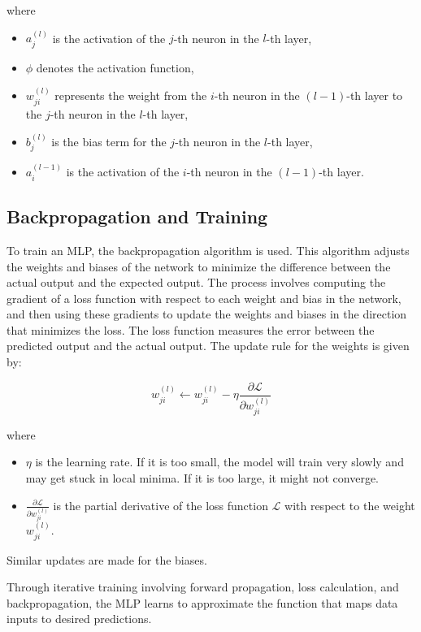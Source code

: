 where
\begin{itemize}
	\item $a^{(l)}_j$ is the activation of the $j$-th neuron in the $l$-th layer,
	\item $\phi$ denotes the activation function,
	\item $w^{(l)}_{ji}$ represents the weight from the $i$-th neuron in the $(l-1)$-th layer to the $j$-th neuron in the $l$-th layer,
	\item $b^{(l)}_j$ is the bias term for the $j$-th neuron in the $l$-th layer,
	\item $a^{(l-1)}_i$ is the activation of the $i$-th neuron in the $(l-1)$-th layer.
\end{itemize}

\subsection{Backpropagation and Training}

To train an MLP, the backpropagation algorithm is used.
This algorithm adjusts the weights and biases of the network to minimize the difference between the actual output and the expected output.
The process involves computing the gradient of a loss function with respect to each weight and bias in the network, and then using these gradients to update the weights and biases in the direction that minimizes the loss.
The loss function measures the error between the predicted output and the actual output. The update rule for the weights is given by:

\begin{equation}
	w^{(l)}_{ji} \leftarrow w^{(l)}_{ji} - \eta \frac{\partial \mathcal{L}}{\partial w^{(l)}_{ji}}
\end{equation}

where
\begin{itemize}
	\item $\eta$ is the learning rate. If it is too small, the model will train very slowly and may get stuck in local minima. If it is too large, it might not converge.
	\item $\frac{\partial \mathcal{L}}{\partial w^{(l)}_{ji}}$ is the partial derivative of the loss function $\mathcal{L}$ with respect to the weight $w^{(l)}_{ji}$.
\end{itemize}
Similar updates are made for the biases.

Through iterative training involving forward propagation, loss calculation, and backpropagation, the MLP learns to approximate the function that maps data inputs to desired predictions.

